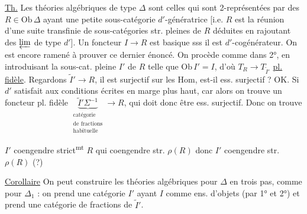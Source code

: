 
\uline{Th.} Les théories algébriques de type $\Delta$ sont celles qui sont 2-représentées par des $R\in\mathrm{Ob}\,\Delta$ ayant une petite sous-catégorie   $d'$-génératrice [i.e.  $R$ est la réunion d'une suite transfinie de sous-catégories str. pleines de $R$ déduites en rajoutant des $\varprojlim$ de type $d'$]. Un foncteur $I\longrightarrow R$  est basique sss il est $d'$-cogénérateur.
On est encore ramené à prouver ce dernier énoncé. On procède comme dans 2°, en introduisant la sous-cat. pleine $I'$ de $R$ telle que $\mathrm{Ob}\,I'=I$, d'où $T_R\longrightarrow T_{\widetilde I'}$ \uline{pl. fidèle}. Regardons $\widetilde I'\longrightarrow R$, il est  surjectif sur les Hom,  est-il ess. surjectif ? OK. Si  $d'$  satisfait aux conditions écrites en marge plus haut, car alors on trouve un \inserted{$\Delta$-}foncteur pl. fidèle $\underbrace{\widetilde I'\Sigma^{-1}}_{\substack{\text{catégorie}\\\text{de fractions}\\\text{habituelle}}}\longrightarrow R$,  qui doit donc être ess. surjectif. Donc on trouve


$I'$ coengendre strict\textsuperscript{mt} $R$ qui coengendre str. $\rho(R)$ donc $I'$ coengendre str. $\rho(R)$ (?)

\uline{Corollaire}  On peut construire les théories algébriques pour $\Delta$ en trois pas, comme pour $\Delta_1$ : on prend une catégorie $I'$ ayant $I$ comme ens. d'objets (par 1° et 2°) et prend une catégorie de fractions de $\widetilde I'$.

